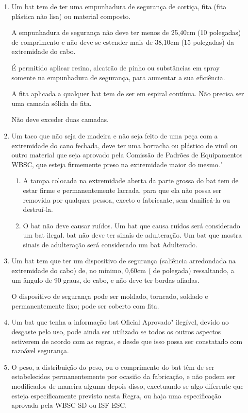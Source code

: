 \begin{enumerate}[label=(\arabic*)]
	\item  Um \gls{bat} tem de ter uma empunhadura de segurança de cortiça, fita (fita plástica não lisa) ou material composto.

	A empunhadura de segurança não deve ter menos de 25,40cm (10 polegadas) de comprimento e não deve se estender mais de 38,10cm (15 polegadas) da extremidade do cabo.

	É permitido aplicar	resina, alcatrão de pinho ou substâncias em spray somente na empunhadura de segurança, para aumentar a sua eficiência.

	A fita aplicada a qualquer \gls{bat} tem	de ser em espiral contínua. Não precisa ser uma camada sólida de fita.

	Não deve exceder duas camadas.

	\item  Um taco que não seja de madeira e não seja feito de uma peça com a extremidade do cano fechada, deve ter uma borracha ou plástico de vinil ou outro material que seja aprovado pela Comissão de Padrões de Equipamentos WBSC, que esteja firmemente preso na extremidade maior do mesmo."

	\begin{enumerate}[label=\roman*.]
		\item A tampa colocada na extremidade aberta da parte grossa do \gls{bat} tem de estar firme e permanentemente lacrada, para que ela não possa ser removida por qualquer pessoa, exceto o fabricante, sem danificá-la ou  destruí-la.
		\item O \gls{bat} não deve causar ruídos. Um \gls{bat} que causa ruídos será considerado um \gls{bat} ilegal. \gls{bat} não deve ter sinais de adulteração. Um \gls{bat} que mostra sinais de adulteração será considerado um \gls{bat} Adulterado.
	\end{enumerate}

	\item  Um \gls{bat} tem que ter um dispositivo de segurança (saliência arredondada na extremidade do cabo) de, no mínimo, 0,60cm (\textonequarter{} de polegada) ressaltando, a um ângulo de 90 graus, do cabo, e não deve ter bordas afiadas.

	O dispositivo de segurança pode ser moldado, torneado, soldado e permanentemente fixo; pode ser coberto com fita.

	\item  Um \gls{bat} que tenha a informação \gls{bat} Oficial Aprovado" ilegível, devido ao desgaste pelo uso, pode ainda ser utilizado se todos os outros aspectos estiverem de acordo com as regras, e desde que isso possa ser constatado com razoável segurança.

	\item  O peso, a distribuição do peso, ou o comprimento do \gls{bat} têm de ser estabelecidos permanentemente por ocasião da fabricação, e não podem ser modificados de maneira alguma depois disso, excetuando-se algo diferente que esteja especificamente previsto nesta Regra, ou haja uma especificação aprovada pela WBSC-SD ou ISF \gls{ESC}.
\end{enumerate}

